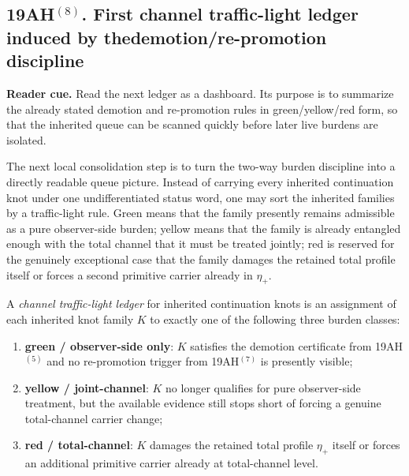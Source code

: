 \subsection*{19AH$^{(8)}$. First channel traffic-light ledger induced by the\protect\linebreak demotion/re-promotion discipline}
\noindent\textbf{Reader cue.} Read the next ledger as a dashboard. Its purpose is to summarize the already stated demotion and re-promotion rules in green/yellow/red form, so that the inherited queue can be scanned quickly before later live burdens are isolated.

The next local consolidation step is to turn the two-way burden discipline into a directly readable queue picture. Instead of carrying every inherited continuation knot under one undifferentiated status word, one may sort the inherited families by a traffic-light rule. Green means that the family presently remains admissible as a pure observer-side burden; yellow means that the family is already entangled enough with the total channel that it must be treated jointly; red is reserved for the genuinely exceptional case that the family damages the retained total profile itself or forces a second primitive carrier already in \(\eta_+\).

\begin{definition}
A \emph{channel traffic-light ledger} for inherited continuation knots is an assignment of each inherited knot family \(K\) to exactly one of the following three burden classes:
\begin{enumerate}[leftmargin=2em]
 \item \textbf{green / observer-side only}: \(K\) satisfies the demotion certificate from 19AH$^{(5)}$ and no re-promotion trigger from 19AH$^{(7)}$ is presently visible;
 \item \textbf{yellow / joint-channel}: \(K\) no longer qualifies for pure observer-side treatment, but the available evidence still stops short of forcing a genuine total-channel carrier change;
 \item \textbf{red / total-channel}: \(K\) damages the retained total profile \(\eta_+\) itself or forces an additional primitive carrier already at total-channel level.
\end{enumerate}
\end{definition}

